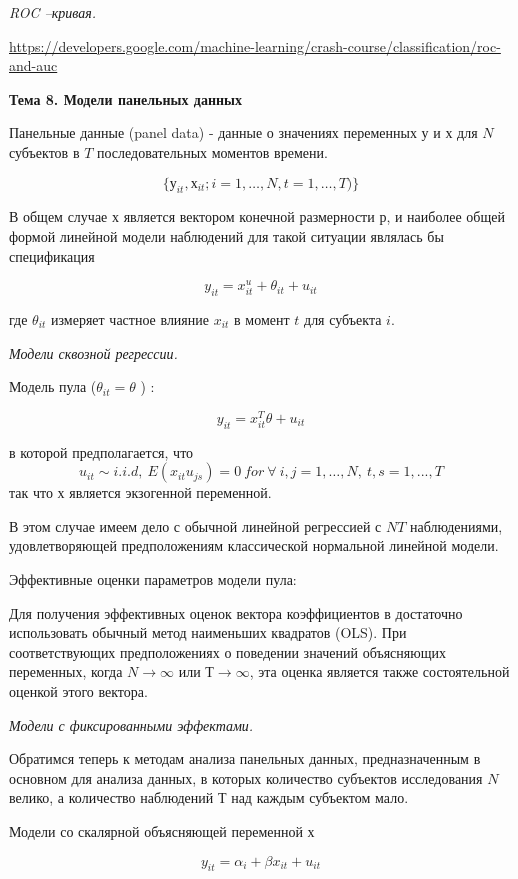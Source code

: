 \documentclass[a4paper,8pt]{article} %
\begin{document}
\textit{ROC –кривая.}

\url{https://developers.google.com/machine-learning/crash-course/classification/roc-and-auc}

\newpage

\textbf{Тема 8. Модели панельных данных} 

Панельные данные (panel data) - данные о значениях переменных $у$ и $х$ для $N$ субъектов в $T$ последовательных моментов времени.

$$\{ у_{it}, х_{it}; i = 1, \dots, N, t = 1, \dots, T) \} $$


В общем случае $х$ является вектором конечной размерности $р$, и наиболее общей формой линейной модели наблюдений для
такой ситуации являлась бы спецификация 

$$y_{it} =x_{it}^u + \theta_{it} + u_{it} $$

где $\theta_{it}$ измеряет частное влияние $x_{it}$ в момент  $t$ для субъекта $i$.


\textit{Модели  сквозной  регрессии.  }

Модель пула ($ \theta_{it} = \theta $ ) :

$$ y_{it} = x_{it}^T \theta + u_{it} $$ 

в которой предполагается, что
$$u_{it} \sim i.i.d, \ E(x_{it}u_{js}) = 0 \ for  \  \forall  \ i,j = 1,\dots, N, \  t, s = 1, ..., T$$
так что $х$ является экзогенной переменной. 

В этом случае имеем дело с обычной линейной регрессией с $NT$ наблюдениями, удовлетворяющей предположениям классической нормальной линейной модели. 

Эффективные оценки параметров модели пула:  

Для получения эффективных оценок вектора коэффициентов в достаточно использовать обычный метод наименьших квадратов (OLS). При соответствующих предположениях о поведении значений объясняющих переменных, когда $N \to \infty$  или $Т \to \infty $,
эта оценка является также состоятельной оценкой этого вектора.



\textit{Модели  с  фиксированными эффектами. }

Обратимся теперь к методам анализа панельных данных, предназначенным
в основном для анализа данных, в которых
количество субъектов исследования $N$ велико, а количество наблюдений $Т$ над каждым субъектом мало. 


Модели со скалярной объясняющей переменной $х$

$$ y_{it} = \alpha_i + \beta x_{it} + u_{it} $$
\end{document}
